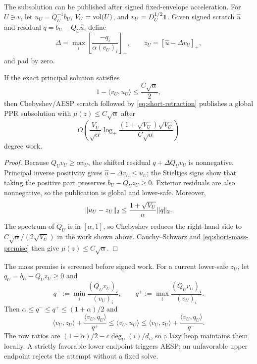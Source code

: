 The subsolution can be published after signed fixed-envelope acceleration.
For $U\ni v$, let $u_U=Q_U^{-1}b_U$, $V_U=\operatorname{vol}(U)$, and
$v_U=D_U^{1/2}\mathbf{1}$.  Given signed scratch $\widehat u$ and residual
$q=b_U-Q_U\widehat u$, define
\begin{equation}
 \Delta=\max_i\left[\frac{-q_i}{\alpha(v_U)_i}\right]_+,
 \qquad z_U=[\widehat u-\Delta v_U]_+,
 \label{eq:short-retraction}
\end{equation}
and pad by zero.

\begin{theorem}
\label{thm:short-aesp-mass}
If the exact principal solution satisfies
\begin{equation}
 1-\langle v_U,u_U\rangle\leq\frac{C\sqrt\alpha}{2},
 \label{eq:short-mass-premise}
\end{equation}
then Chebyshev/AESP scratch followed by
\cref{eq:short-retraction} publishes a global PPR subsolution with
$\mu(z)\leq C\sqrt\alpha$ after
\begin{equation}
 O\!\left(\frac{V_U}{\sqrt\alpha}
   \log_+\frac{(1+\sqrt{V_U})\sqrt{V_U}}
                    {C\sqrt\alpha}\right)
 \label{eq:short-aesp-work}
\end{equation}
degree work.
\end{theorem}

\begin{proof}
Because $Q_Uv_U\geq\alpha v_U$, the shifted residual
$q+\Delta Q_Uv_U$ is nonnegative.  Principal inverse positivity gives
$\widehat u-\Delta v_U\leq u_U$; the Stieltjes signs show that taking the
positive part preserves $b_U-Q_Uz_U\geq0$.  Exterior residuals are also
nonnegative, so the publication is global and lower-safe.  Moreover,
\begin{equation*}
 \lVert u_U-z_U\rVert_2
 \leq\frac{1+\sqrt{V_U}}{\alpha}\lVert q\rVert_2.
\end{equation*}
The spectrum of $Q_U$ is in $[\alpha,1]$, so Chebyshev reduces the right-hand
side to $C\sqrt\alpha/(2\sqrt{V_U})$ in the work shown above.  Cauchy--Schwarz
and \cref{eq:short-mass-premise} then give $\mu(z)\leq C\sqrt\alpha$.
\end{proof}

The mass premise is screened before signed work.  For a current lower-safe
$z_U$, let $q_U=b_U-Q_Uz_U\geq0$ and
\begin{equation*}
 q^-:=\min_i\frac{(Q_Uv_U)_i}{(v_U)_i},\qquad
 q^+:=\max_i\frac{(Q_Uv_U)_i}{(v_U)_i}.
\end{equation*}
Then $\alpha\leq q^-\leq q^+\leq(1+\alpha)/2$ and
\begin{equation}
 \langle v_U,z_U\rangle+\frac{\langle v_U,q_U\rangle}{q^+}
 \leq\langle v_U,u_U\rangle
 \leq\langle v_U,z_U\rangle+\frac{\langle v_U,q_U\rangle}{q^-}.
 \label{eq:short-mass-interval}
\end{equation}
The row ratios are
$(1+\alpha)/2-c\deg_U(i)/d_i$, so a lazy heap maintains them locally.  A
strictly favorable lower endpoint triggers AESP; an unfavorable upper
endpoint rejects the attempt without a fixed solve.

